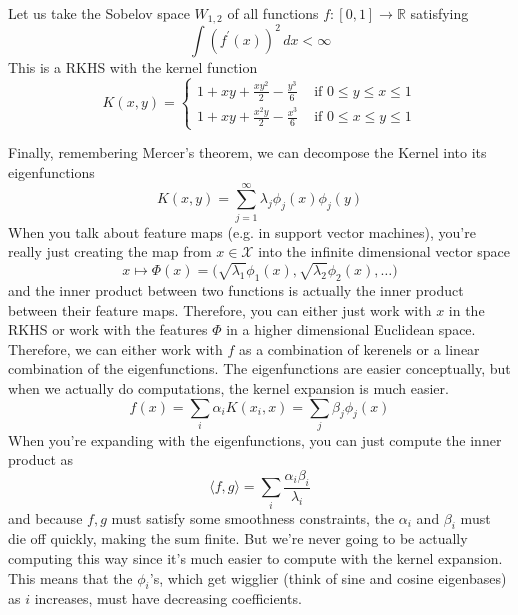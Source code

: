 \documentclass{article}
\begin{document}
  \begin{example}
    Let us take the Sobelov space $W_{1, 2}$ of all functions $f: [0, 1] \rightarrow \mathbb{R}$ satisfying 
    \begin{equation}
      \int (f^\prime (x))^2 \,dx < \infty
    \end{equation} 
    This is a RKHS with the kernel function 
    \begin{equation}
      K(x, y) = \begin{cases} 1 + xy + \frac{xy^2}{2} - \frac{y^3}{6} & \text{ if } 0 \leq y \leq x \leq 1 \\
        1 + xy + \frac{x^2 y}{2} - \frac{x^3}{6} & \text{ if } 0 \leq x \leq y \leq 1 \end{cases}
    \end{equation}
  \end{example}

  Finally, remembering Mercer's theorem, we can decompose the Kernel into its eigenfunctions 
  \begin{equation}
    K(x, y) = \sum_{j=1}^\infty \lambda_j \phi_j(x) \phi_j(y) 
  \end{equation}
  When you talk about feature maps (e.g. in support vector machines), you're really just creating the map from $x \in \mathcal{X}$ into the infinite dimensional vector space 
  \begin{equation}
    x \mapsto \Phi(x) = \big( \sqrt{\lambda_1} \phi_1(x), \sqrt{\lambda_2} \phi_2(x), \ldots \big)
  \end{equation}
  and the inner product between two functions is actually the inner product between their feature maps. Therefore, you can either just work with $x$ in the RKHS or work with the features $\Phi$ in a higher dimensional Euclidean space. Therefore, we can either work with $f$ as a combination of kerenels or a linear combination of the eigenfunctions. The eigenfunctions are easier conceptually, but when we actually do computations, the kernel expansion is much easier. 
  \begin{equation}
    f(x) = \sum_{i} \alpha_i K(x_i, x) = \sum_j \beta_j \phi_j(x) 
  \end{equation}
  When you're expanding with the eigenfunctions, you can just compute the inner product as 
  \begin{equation}
    \langle f, g \rangle = \sum_i \frac{\alpha_i \beta_i}{\lambda_i}
  \end{equation}
  and because $f, g$ must satisfy some smoothness constraints, the $\alpha_i$ and $\beta_i$ must die off quickly, making the sum finite. But we're never going to be actually computing this way since it's much easier to compute with the kernel expansion. This means that the $\phi_i$'s, which get wigglier (think of sine and cosine eigenbases) as $i$ increases, must have decreasing coefficients. 
\end{document}

